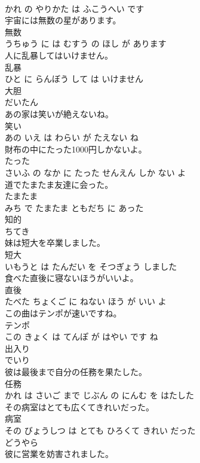\documentclass[8pt]{extreport}
\begin{document}
\begin{CJK}{UTF8}{min}
\\	かれ の やりかた は ふこうへい です			
\\	宇宙には無数の星があります。	
\\	無数 
\\	うちゅう に は むすう の ほし が あります			
\\	人に乱暴してはいけません。	
\\	乱暴 
\\	ひと に らんぼう して は いけません			
\\	大胆	
\\	だいたん			
\\	あの家は笑いが絶えないね。	
\\	笑い 
\\	あの いえ は わらい が たえない ね			
\\	財布の中にたった1000円しかないよ。	
\\	たった 
\\	さいふ の なか に たった せんえん しか ない よ			
\\	道でたまたま友達に会った。	
\\	たまたま 
\\	みち で たまたま ともだち に あった			
\\	知的	
\\	ちてき			
\\	妹は短大を卒業しました。	
\\	短大 
\\	いもうと は たんだい を そつぎょう しました			
\\	食べた直後に寝ないほうがいいよ。	
\\	直後 
\\	たべた ちょくご に ねない ほう が いい よ			
\\	この曲はテンポが速いですね。	
\\	テンポ 
\\	この きょく は てんぽ が はやい です ね			
\\	出入り	
\\	でいり			
\\	彼は最後まで自分の任務を果たした。	
\\	任務 
\\	かれ は さいご まで じぶん の にんむ を はたした			
\\	その病室はとても広くてきれいだった。	
\\	病室 
\\	その びょうしつ は とても ひろくて きれい だった			
\\	どうやら	
\\	彼に営業を妨害されました。	

\end{CJK}
\end{document}
